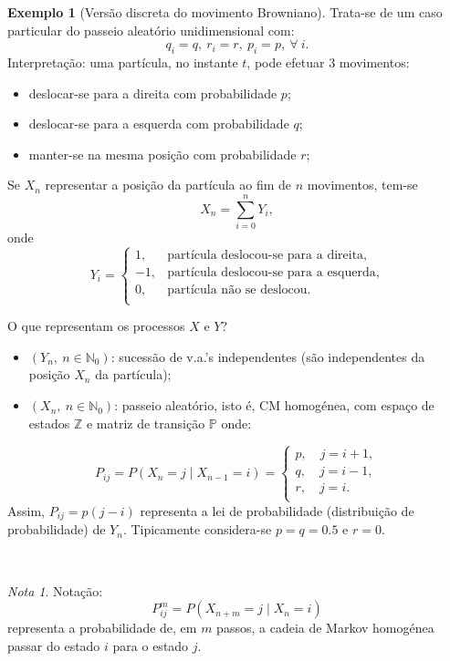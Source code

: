 \documentclass[
  11pt,
  a4paper,
]{book}
\theoremstyle{definition}
\theoremstyle{definition}
\newtheorem{example}{Exemplo}[chapter]
\theoremstyle{definition}
\theoremstyle{definition}
\theoremstyle{remark}
\newtheorem*{remark}{Nota }
\begin{document}
\begin{example}[Versão discreta do movimento Browniano]
Trata-se de um caso particular do passeio aleatório unidimensional com:
\[q_i=q, ~r_i=r, ~ p_i=p, ~\forall ~i.\]
Interpretação: uma partícula, no instante \(t\), pode efetuar 3 movimentos:

\begin{itemize}
\item
  deslocar-se para a direita com probabilidade \(p\);
\item
  deslocar-se para a esquerda com probabilidade \(q\);
\item
  manter-se na mesma posição com probabilidade \(r\);
\end{itemize}

Se \(X_n\) representar a posição da partícula ao fim de \(n\) movimentos, tem-se
\[X_n=\sum\limits_{i=0}^n Y_i,\]
onde
\[
Y_i=
\begin{cases}
1, & \text{partícula deslocou-se para a direita},\\
-1, & \text{partícula deslocou-se para a esquerda},\\
0, & \text{partícula não se deslocou}.\\
\end{cases}
\]

O que representam os processos \(X\) e \(Y\)?

\begin{itemize}
\item
  \((Y_n, ~n \in \mathbb{N}_0)\): sucessão de v.a.'s independentes (são independentes da posição \(X_n\) da partícula);
\item
  \((X_n, ~n \in \mathbb{N}_0)\): passeio aleatório, isto é, CM homogénea, com espaço de estados \(\mathbb{Z}\) e matriz de transição \(\mathbb{P}\) onde:
\end{itemize}

\[
P_{ij}=P(X_n=j \mid X_{n-1}=i)=
\begin{cases}
p, \quad j=i+1,\\
q, \quad j=i-1,\\
r, \quad j=i.\\
\end{cases}
\]
Assim, \(P_{ij}=p(j-i)\) representa a lei de probabilidade (distribuição de probabilidade) de \(Y_n\). Tipicamente considera-se \(p=q=0.5\) e \(r=0\).
\end{example}

\(\,\)

\begin{remark}
Notação:
\[P^m_{ij}=P(X_{n+m}=j \mid X_n=i)\]
representa a probabilidade de, em \(m\) passos, a cadeia de Markov homogénea passar do estado \(i\) para o estado \(j\).
\end{remark}
\end{document}
